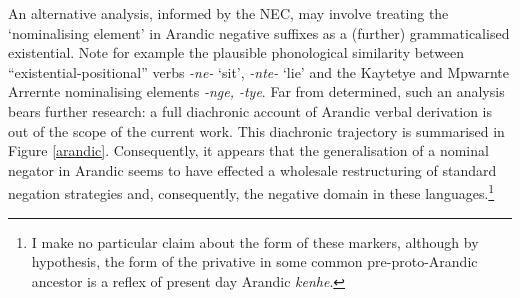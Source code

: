 {	An alternative analysis, informed by the \acrshort{NEC}, may involve treating the `nominalising element' in Arandic negative suffixes as a (further) grammaticalised existential. Note for example the plausible phonological similarity between ``existential-positional'' verbs \textit{-ne-} `sit', \textit{-nte-} `lie' and the Kaytetye and Mpwarnte Arrernte nominalising elements \textit{-nge, -tye}. Far from determined, such an analysis bears further research: a full diachronic account of Arandic verbal derivation is out of the scope of the current work.} This diachronic trajectory is summarised in Figure \ref{arandic}. %
Consequently, it appears that the generalisation of a nominal negator in Arandic seems to have effected a wholesale restructuring of standard negation strategies and, consequently, the negative domain in these languages.\footnote{I make no particular claim about the form of these markers, although by hypothesis, the form of the privative in some common pre-proto-Arandic ancestor is a reflex of present day Arandic \textit{\textdblhyphen kenhe}.}
